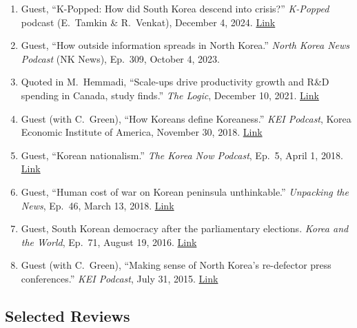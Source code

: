 \documentclass[11pt, a4paper]{article}
\begin{document}
\begin{enumerate}[itemsep=0.15em]
  \item Guest, ``K-Popped: How did South Korea descend into crisis?'' \textit{K-Popped} podcast (E.\ Tamkin \& R.\ Venkat), December 4, 2024. \href{https://rohanvenkat.substack.com/p/k-popped-how-did-south-korea-descend-999}{Link}

  \item Guest, ``How outside information spreads in North Korea.'' \textit{North Korea News Podcast} (NK News), Ep.\ 309, October 4, 2023.

  \item Quoted in M.\ Hemmadi, ``Scale-ups drive productivity growth and R\&D spending in Canada, study finds.'' \textit{The Logic}, December 10, 2021. \href{https://thelogic.co/news/scale-ups-drive-productivity-growth-and-rd-spending-in-canada-study-finds}{Link}

  \item Guest (with C.\ Green), ``How Koreans define Koreaness.'' \textit{KEI Podcast}, Korea Economic Institute of America, November 30, 2018. \href{https://keia.org/podcasts/how-koreans-define-koreaness-christopher-green-and-steven-denney/}{Link}

  \item Guest, ``Korean nationalism.'' \textit{The Korea Now Podcast}, Ep.\ 5, April 1, 2018. \href{https://korea-now-podcast.libsyn.com/the-korea-now-podcast-5-steven-denney-korean-nationalism}{Link}

  \item Guest, ``Human cost of war on Korean peninsula unthinkable.'' \textit{Unpacking the News}, Ep.\ 46, March 13, 2018. \href{https://www.spreaker.com/user/8993462/utn-ep46-steve-denney-final-mastere}{Link}

  \item Guest, South Korean democracy after the parliamentary elections. \textit{Korea and the World}, Ep.\ 71, August 19, 2016. \href{https://www.koreaandtheworld.org/steven-denney/}{Link}

  \item Guest (with C.\ Green), ``Making sense of North Korea's re-defector press conferences.'' \textit{KEI Podcast}, July 31, 2015. \href{https://keia.org/podcasts/making-sense-of-north-koreas-re-defector-press-conferences/}{Link}
\end{enumerate}

\subsection{Selected Reviews}
\end{document}
